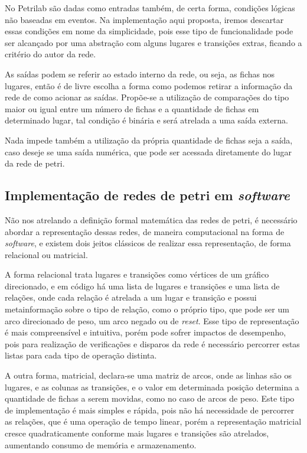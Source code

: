 No Petrilab são dadas como entradas também, de certa forma, condições lógicas não baseadas em eventos. Na implementação aqui proposta, iremos descartar essas condições em nome da simplicidade, pois esse tipo de funcionalidade pode ser alcançado por uma abstração com alguns lugares e transições extras, ficando a critério do autor da rede.

As saídas podem se referir ao estado interno da rede, ou seja, as fichas nos lugares, então é de livre escolha a forma como podemos retirar a informação da rede de como acionar as saídas. Propõe-se a utilização de comparações do tipo maior ou igual entre um número de fichas e a quantidade de fichas em determinado lugar, tal condição é binária e será atrelada a uma saída externa.

Nada impede também a utilização da própria quantidade de fichas seja a saída, caso deseje se uma saída numérica, que pode ser acessada diretamente do lugar da rede de petri.

\subsection{Implementação de redes de petri em \textit{software}}

Não nos atrelando a definição formal matemática das redes de petri, é necessário abordar a representação dessas redes, de maneira computacional na forma de \textit{software}, e existem dois jeitos clássicos de realizar essa representação, de forma relacional ou matricial.

A forma relacional trata lugares e transições como vértices de um gráfico direcionado, e em código há uma lista de lugares e transições e uma lista de relações, onde cada relação é atrelada a um lugar e transição e possui metainformação sobre o tipo de relação, como o próprio tipo, que pode ser um arco direcionado de peso, um arco negado ou de \textit{reset}. Esse tipo de representação é mais compreensível e intuitiva, porém pode sofrer impactos de desempenho, pois para realização de verificações e disparos da rede é necessário percorrer estas listas para cada tipo de operação distinta.

A outra forma, matricial, declara-se uma matriz de arcos, onde as linhas são os lugares, e as colunas as transições, e o valor em determinada posição determina a quantidade de fichas a serem movidas, como no caso de arcos de peso. Este tipo de implementação é mais simples e rápida, pois não há necessidade de percorrer as relações, que é uma operação de tempo linear, porém a representação matricial cresce quadraticamente conforme mais lugares e transições são atrelados, aumentando consumo de memória e armazenamento. 

